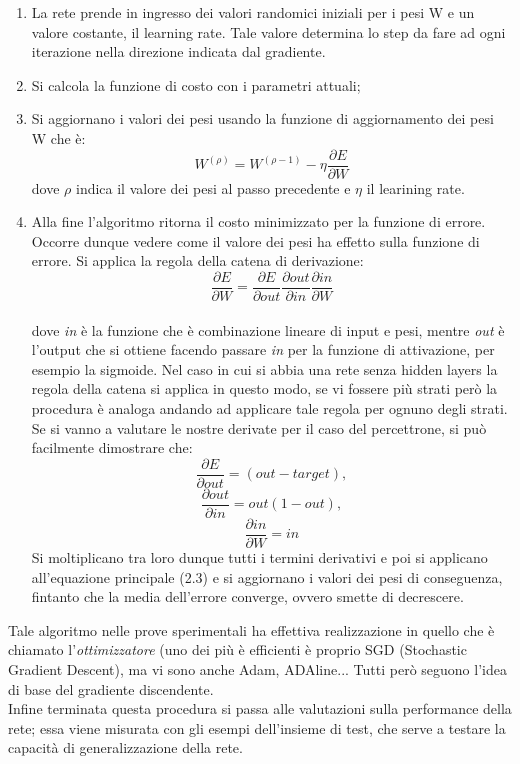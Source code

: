 \begin{enumerate}
\item La rete prende in ingresso dei valori randomici iniziali per i pesi W e un valore costante,
 il learning rate. Tale valore determina lo step da fare ad 
 ogni iterazione nella direzione indicata dal gradiente. 
\item Si calcola la funzione di costo con i parametri attuali;
\item Si aggiornano i valori dei pesi usando la funzione di aggiornamento dei pesi W che è:
 \begin{equation} \label{3}
W^{(\rho)} = W^{(\rho -1)} - \eta \frac{\partial E}{\partial W}
\end{equation}
dove \(\rho\) indica il valore dei pesi al passo precedente e \(\eta\) il learining rate.
\item Alla fine l'algoritmo ritorna il costo minimizzato per la funzione di errore. \\

Occorre dunque vedere come il valore dei pesi ha effetto sulla funzione di errore.
 Si applica la regola della catena di derivazione:\\

\[\frac{\partial E}{\partial W}  = \frac{\partial E}{\partial out}  \frac{\partial out}{\partial in}  \frac{\partial in}{\partial W} \] \\

dove \emph{in} è la funzione che è combinazione lineare di input e pesi, 
mentre \emph{out} è l’output che si ottiene facendo passare \emph{in} per la funzione di attivazione,
 per esempio la sigmoide.
Nel caso in cui si abbia una rete senza hidden layers la regola della catena si applica in questo modo, 
se vi fossere più strati però la procedura è analoga andando ad applicare tale regola
 per ognuno degli strati. 
Se si vanno a valutare le nostre derivate per il caso del percettrone, si può facilmente dimostrare che:\\
\[\frac{\partial E}{\partial out} = (out - target),\]
\[\frac{\partial out}{\partial in} = out(1-out),\]
\[\frac{\partial in}{\partial W} = in \]
Si moltiplicano tra loro dunque tutti i termini derivativi e poi si applicano all’equazione principale (2.3) 
e si aggiornano i valori dei pesi di conseguenza, fintanto che la media dell’errore converge, ovvero smette
 di decrescere. 
\end{enumerate}
Tale algoritmo nelle prove sperimentali ha effettiva realizzazione in quello che è chiamato l’\emph{ottimizzatore}
 (uno dei più è efficienti è proprio SGD (Stochastic Gradient Descent), ma vi sono anche Adam, ADAline... 
 Tutti però seguono l’idea di base del gradiente discendente.\\ 
 Infine terminata questa procedura si passa alle valutazioni sulla performance della rete;
  essa viene misurata con gli esempi dell’insieme di test, che serve a testare la capacità di 
  generalizzazione della rete.

